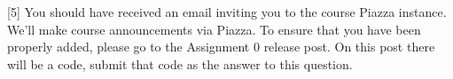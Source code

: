 \documentclass{16384_doc}
\begin{document}
\begin{questions}
    [5]
        You should have received an email inviting you to the course Piazza
        instance.  We'll make course announcements via Piazza. To ensure that
        you have been properly added, please go to the Assignment 0 release post.
        On this post there will be a code, submit that code as the answer to this question.
        
        \begin{tcolorbox}[height=3cm]
        
        \end{tcolorbox}

 

    \newpage

\end{questions}
\end{document}
